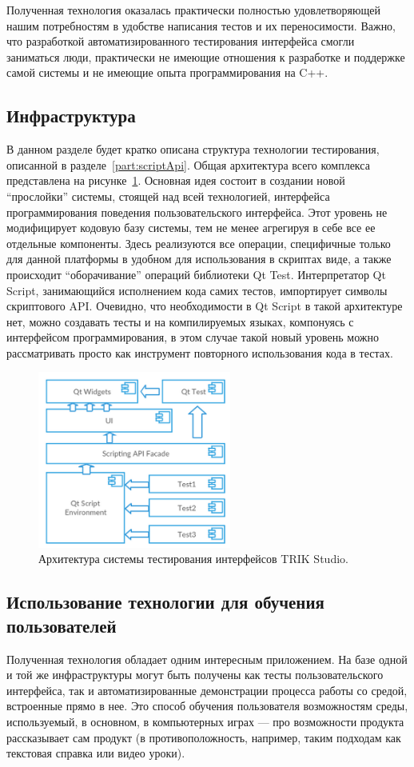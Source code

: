 \documentclass[conference]{IEEEtran}
\begin{document}
Полученная технология оказалась практически полностью удовлетворяющей нашим потребностям в удобстве написания 
тестов и их переносимости. Важно, что разработкой автоматизированного тестирования интерфейса смогли заниматься 
люди, практически не имеющие отношения к разработке и поддержке самой системы и не имеющие опыта программирования на C++.

\subsection{Инфраструктура}
В данном разделе будет кратко описана структура технологии тестирования, описанной в разделе~\ref{part:scriptApi}. 
Общая архитектура всего комплекса представлена на рисунке~\ref{image:architecture}. Основная идея состоит 
в создании новой "`прослойки"' системы, стоящей над всей технологией, интерфейса программирования поведения 
пользовательского интерфейса. Этот уровень не модифицирует кодовую базу системы, тем не менее агрегируя в 
себе все ее отдельные компоненты. Здесь реализуются все операции, специфичные только для данной платформы 
в удобном для использования в скриптах виде, а также происходит "`оборачивание"' операций библиотеки Qt Test. 
Интерпретатор Qt Script, занимающийся исполнением кода самих тестов, импортирует символы скриптового API. 
Очевидно, что необходимости в Qt Script в такой архитектуре нет, можно создавать тесты и на компилируемых 
языках, компонуясь с интерфейсом программирования, в этом случае такой новый уровень можно рассматривать 
просто как инструмент повторного использования кода в тестах.

\begin{figure}[!t]
	\centering
	\includegraphics[width=2.5in]{guiTestingArchitecture.png}
	\caption{Архитектура системы тестирования интерфейсов TRIK Studio.}
	\label{image:architecture}
\end{figure}

\subsection{Использование технологии для обучения пользователей}
\label{part:demos}
Полученная технология обладает одним интересным приложением. На базе одной и той же инфраструктуры могут 
быть получены как тесты пользовательского интерфейса, так и автоматизированные демонстрации процесса работы 
со средой, встроенные прямо в нее. Это способ обучения пользователя возможностям среды, используемый, в 
основном, в компьютерных играх --- про возможности продукта рассказывает сам продукт (в противоположность, 
например, таким подходам как текстовая справка или видео уроки).
\end{document}
